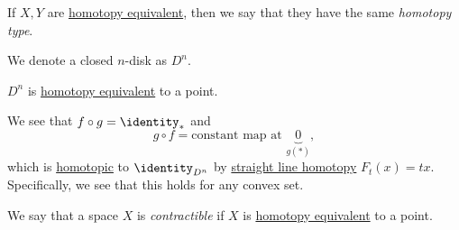 \begin{definition}\label{def:homotopy-type}
	If \(X, Y\) are \hyperref[def:homotopy-equivalence]{homotopy equivalent}, then we say that they have the
	same \emph{homotopy type}.
\end{definition}

\begin{notation}
	We denote a closed \(n\)-disk as \(D^n\).
\end{notation}
\begin{eg}
	\(D^n\) is \hyperref[def:homotopy-equivalence]{homotopy equivalent} to a point.
	\begin{figure}[H]
		\centering
		\label{fig:eg:closed-disk-eq-point}
	\end{figure}
\end{eg}
\begin{explanation}
	We see that \(f\circ g = \identity_\ast\) and
	\[
		g\circ f = \text{constant map at }\underbrace{0}_{g(\ast)},
	\]
	which is \hyperref[def:homotopic]{homotopic} to \(\identity_{D^n}\) by
	\hyperref[eg:lec1:straight-line-homotopy]{straight line homotopy} \(F_t(x) = tx\). Specifically, we see that this holds for any convex set.
\end{explanation}

\begin{definition}[Contractible]\label{def:contractible}
	We say that a space \(X\) is \emph{contractible} if \(X\) is \hyperref[def:homotopy-equivalence]{homotopy equivalent}
	to a point.
\end{definition}

